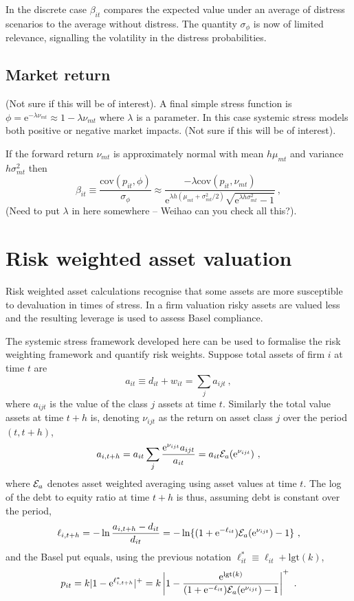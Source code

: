 \documentclass[authoryear]{elsarticle}
\newcommand{\logit}{\mathrm{lgt}}
\newcommand{\e}{\mathrm{e}}
\newcommand{\cov}{\mathrm{cov}}
\newcommand{\Ex}{{\cal E}}
\newcommand{\be}[1]{\begin{equation}\label{#1}}
\newcommand{\ee}{\end{equation}}
\begin{document}
In the discrete case $\beta_{it}$ compares the expected value under an average of distress scenarios to the average without distress.  The quantity $\sigma_\phi$ is now of limited relevance, signalling the volatility in the distress probabilities. 

\subsection{Market return}

(Not sure if this will be of interest).   A final simple stress function is $\phi=\e^{-\lambda\nu_{mt}}\approx 1-\lambda\nu_{mt}$ where $\lambda$ is a parameter.   In this case systemic stress models both positive or negative market impacts.   (Not sure if this will be of interest).

If the forward return  $\nu_{mt}$ is approximately normal with mean $h\mu_{mt}$ and variance $ h\sigma^2_{mt}$ then
$$
\beta_{it}\equiv \frac{\cov(p_{it},\phi)}{\sigma_\phi}   \approx \frac{-\lambda\cov(p_{it},\nu_{mt})}{\e^{\lambda h(\mu_{mt}+\sigma_{mt}^2/2)}\sqrt{\e^{\lambda h\sigma_{mt}^2}-1}}\ ,
$$
(Need to put $\lambda$ in here somewhere -- Weihao can you check all this?).  


   

\section{Risk weighted asset valuation}

Risk weighted asset calculations recognise that some assets are more susceptible to  devaluation in times of stress.  In a firm  valuation risky assets are  valued less and the  resulting leverage is used to assess Basel compliance.

The systemic stress framework developed here can be used to formalise the risk weighting framework and quantify risk weights.
Suppose total assets of firm $i$ at time $t$ are
$$
a_{it}\equiv d_{it}+w_{it}  = \sum_j a_{ijt} \ ,
$$
where  $a_{ijt}$ is the value of the class  $j$ assets at time $t$.   Similarly the total value assets at time $t+h$ is, denoting $\nu_{ijt}$ as the return on asset class $j$ over the period $(t,t+h)$, 
$$
 a_{i,t+h} = a_{it}\sum_j \frac{\e^{\nu_{ijt}}a_{ijt}}{a_{it}} = a_{it}\Ex_a(\e^{\nu_{ijt}})\ ,
$$
where $\Ex_a$ denotes asset weighted averaging using asset values at time $t$.
The log of the debt to equity ratio at time $t+h$ is thus, assuming debt is constant over the period,
$$
\ell_{i,t+h} = -\ln \frac{a_{i,t+h}-d_{it}}{d_{it}} = -\ln\{(1+\e^{-\ell_{it}})\Ex_a(\e^{\nu_{ijt}})-1\}\ ,
$$
and the Basel put equals, using the previous notation $\ell_{it}^*\equiv\ell_{it}+\logit(k)$,
\be{asset}
p_{it} = k|1-\e^{\ell^*_{i,t+h}}|^+ = k\left|1-\frac{\e^{\logit(k)}}{(1+\e^{-\ell_{it}})\Ex_a(\e^{\nu_{ijt}})-1}\right|^+ \ .
\ee
\end{document}
